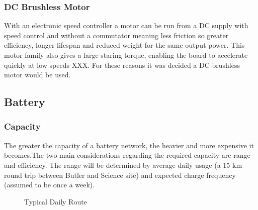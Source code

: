 \documentclass[journal,10pt]{IEEEtran}
\begin{document}
        \subsubsection{DC Brushless Motor}
            With an electronic speed controller a motor can be run from a DC supply with speed control and without a commutator meaning less friction so greater efficiency, longer lifespan and reduced weight for the same output power. This motor family also gives a large staring torque, enabling the board to accelerate quickly at low speeds XXX. For these reasons it was decided a DC brushless motor would be used.
    \subsection{Battery}
        \subsubsection{Capacity}
            The greater the capacity of a battery network, the heavier and more expensive it becomes.The two main considerations regarding the required capacity are range and efficiency. The range will be determined by average daily usage (a 15 km round trip between Butler and Science site) and expected charge frequency (assumed to be once a week).
            \begin{figure}[H]
                \centering
                \caption{Typical Daily Route}
                \label{fig:route}
            \end{figure}
\end{document}
